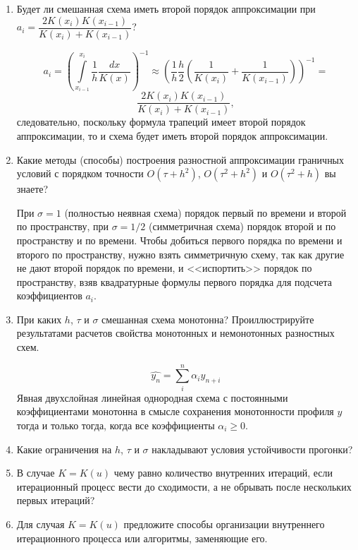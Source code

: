 \documentclass[12pt, a4paper]{article}
\begin{document}
\begin{enumerate}
\item Будет ли смешанная схема иметь второй порядок аппроксимации при $a_i = \dfrac{2 K(x_i)K(x_{i-1})}{K(x_i) + K(x_{i-1})}$?

\[
a_i = \left(\int\limits_{x_{i-1}}^{x_{i}}{\dfrac{1}{h}\dfrac{dx}{K(x)}}\right)^{-1} \approx \left(\dfrac{1}{h}\dfrac{h}{2}\left(\dfrac{1}{K(x_{i})} + \dfrac{1}{K(x_{i-1})}\right)\right)^{-1} = 
\]
\[
\dfrac{2 K(x_i)K(x_{i-1})}{K(x_i) + K(x_{i-1})},
\]
следовательно, поскольку формула трапеций имеет второй порядок аппроксимации, то и схема будет иметь второй порядок аппроксимации. 

\item Какие методы (способы) построения разностной аппроксимации граничных условий с порядком точности $O(\tau + h^2)$, $O(\tau^2 +h^2)$ и $O(\tau^2 + h)$ вы знаете?

При $\sigma = 1$ (полностью неявная схема) порядок первый по времени и второй по пространству, при $\sigma  = 1/2$ (симметричная схема) порядок второй и по пространству и по времени. Чтобы добиться первого порядка по времени и второго по пространству, нужно взять симметричную схему, так как другие не дают второй порядок по времени, и <<испортить>> порядок по пространству, взяв квадратурные формулы первого порядка для подсчета коэффициентов $a_i$.

\item При каких $h$, $\tau$ и $\sigma$ смешанная схема монотонна? Проиллюстрируйте результатами расчетов свойства монотонных и немонотонных разностных схем.

\[
\hat{y_n} = \sum_{i}^{n}{\alpha_i y_{n+i}}
\]
Явная двухслойная линейная однородная схема с постоянными коэффициентами монотонна в смысле сохранения монотонности профиля $y$ тогда и только тогда, когда все коэффициенты $\alpha_i \geq 0$.

\item Какие ограничения на $h$, $\tau$ и $\sigma$ накладывают условия устойчивости прогонки?

\item В случае $K=K(u)$ чему равно количество внутренних итераций, если итерационный процесс вести до сходимости, а не обрывать после нескольких первых итераций?

\item Для случая $K = K(u)$ предложите способы организации внутреннего итерационного процесса или алгоритмы, заменяющие его.
\end{enumerate}


\newpage
\end{document}
